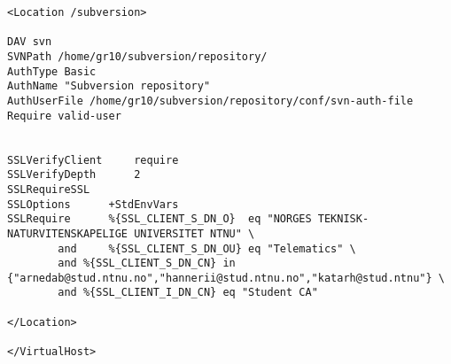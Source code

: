 \begin{lstlisting}
<Location /subversion>

DAV svn
SVNPath /home/gr10/subversion/repository/
AuthType Basic
AuthName "Subversion repository"
AuthUserFile /home/gr10/subversion/repository/conf/svn-auth-file
Require valid-user


SSLVerifyClient 	require
SSLVerifyDepth		2 
SSLRequireSSL	
SSLOptions 		+StdEnvVars
SSLRequire 		%{SSL_CLIENT_S_DN_O}  eq "NORGES TEKNISK-NATURVITENSKAPELIGE UNIVERSITET NTNU" \
		and 	%{SSL_CLIENT_S_DN_OU} eq "Telematics" \
		and	%{SSL_CLIENT_S_DN_CN} in {"arnedab@stud.ntnu.no","hannerii@stud.ntnu.no","katarh@stud.ntnu"} \
		and	%{SSL_CLIENT_I_DN_CN} eq "Student CA"

</Location>

</VirtualHost>

\end{lstlisting}
